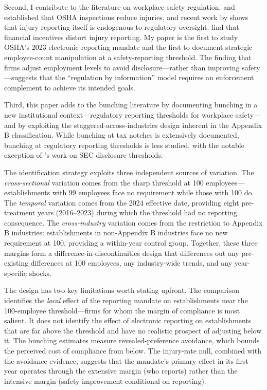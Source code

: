 \documentclass[12pt]{article}
\begin{document}
Second, I contribute to the literature on workplace safety regulation. \citet{viscusi1979} and \citet{scholz1984} established that OSHA inspections reduce injuries, and recent work by \citet{johnson2020} shows that injury reporting itself is endogenous to regulatory oversight. \citet{li2011} find that financial incentives distort injury reporting. My paper is the first to study OSHA's 2023 electronic reporting mandate and the first to document strategic employee-count manipulation at a safety-reporting threshold. The finding that firms adjust employment levels to avoid disclosure---rather than improving safety---suggests that the ``regulation by information'' model requires an enforcement complement to achieve its intended goals.

Third, this paper adds to the bunching literature \citep{saez2010, chetty2011, kleven2013} by documenting bunching in a new institutional context---regulatory reporting thresholds for workplace safety---and by exploiting the staggered-across-industries design inherent in the Appendix B classification. While bunching at tax notches is extensively documented, bunching at regulatory reporting thresholds is less studied, with the notable exception of \citet{duchin2022}'s work on SEC disclosure thresholds.

The identification strategy exploits three independent sources of variation. The \textit{cross-sectional} variation comes from the sharp threshold at 100 employees---establishments with 99 employees face no requirement while those with 100 do. The \textit{temporal} variation comes from the 2024 effective date, providing eight pre-treatment years (2016--2023) during which the threshold had no reporting consequence. The \textit{cross-industry} variation comes from the restriction to Appendix B industries: establishments in non-Appendix B industries face no new requirement at 100, providing a within-year control group. Together, these three margins form a difference-in-discontinuities design that differences out any pre-existing differences at 100 employees, any industry-wide trends, and any year-specific shocks.

The design has two key limitations worth stating upfront. The comparison identifies the \textit{local} effect of the reporting mandate on establishments near the 100-employee threshold---firms for whom the margin of compliance is most salient. It does not identify the effect of electronic reporting on establishments that are far above the threshold and have no realistic prospect of adjusting below it. The bunching estimates measure revealed-preference avoidance, which bounds the perceived cost of compliance from below. The injury-rate null, combined with the avoidance evidence, suggests that the mandate's primary effect in its first year operates through the extensive margin (who reports) rather than the intensive margin (safety improvement conditional on reporting).
\end{document}
